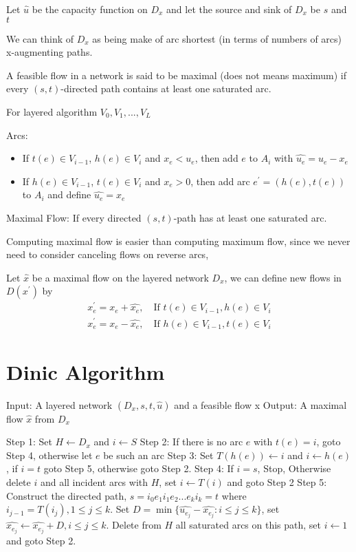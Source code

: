 				Let $\hat{u}$ be the capacity function on $D_x$ and let the source and sink of $D_x$ be $s$ and $t$

				We can think of $D_x$ as being make of arc shortest (in terms of numbers of arcs) x-augmenting paths.

				A feasible flow in a network is said to be maximal (does not means maximum) if every $(s, t)$-directed path contains at least one saturated arc.

				For layered algorithm $V_0, V_1, ..., V_L$

				Arcs:
				\begin{itemize}
					\item If $t(e)\in V_{i-1}$, $h(e) \in V_i$ and $x_e < u_e$, then add $e$ to $A_i$ with $\hat{u_e} = u_e - x_e$
					\item If $h(e) \in V_{i-1}$, $t(e)\in V_i$ and $x_e > 0$, then add arc $e^\prime = (h(e), t(e))$ to $A_i$ and define $\hat{u_e} = x_e$
				\end{itemize}

				Maximal Flow: If every directed $(s, t)$-path has at least one saturated arc.

				Computing maximal flow is easier than computing maximum flow, since we never need to consider canceling flows on reverse arcs,

				Let $\hat{x}$ be a maximal flow on the layered network $D_x$, we can define new flows in $D(x^\prime)$ by
				\begin{align}
					x_e^\prime = x_e + \hat{x_e}, \quad \text{If } t(e) \in V_{i-1}, h(e)\in V_i\\
					x_e^\prime = x_e - \hat{x_e}, \quad \text{If } h(e) \in V_{i-1}, t(e)\in V_i
				\end{align}

			\section{Dinic Algorithm}
				Input: A layered network $(D_x, s, t, \hat{u})$ and a feasible flow x
				Output: A maximal flow $\hat{x}$ from $D_x$

				Step 1: Set $H\gets D_x$ and $i\gets S$
				Step 2: If there is no arc $e$ with $t(e) = i$, goto Step 4, otherwise let $e$ be such an arc
				Step 3: Set $T(h(e))\gets i$ and $i \gets h(e)$, if $i= t$ goto Step 5, otherwise goto Step 2.
				Step 4: If $i = s$, Stop, Otherwise delete $i$ and all incident arcs with $H$, set $i \gets T(i)$ and goto Step 2
				Step 5: Construct the directed path, $s = i_0e_1i_1e_2...e_ki_k=t$ where $i_{j-1} = T(i_j), 1\le j \le k$. Set $D=\min\{\hat{u_{e_j}}-\hat{x_{e_j}}:i\le j \le k\}$, set $\hat{x_{e_j}} \gets \hat{x_{e_j}} + D, i \le j \le k$. Delete from $H$ all saturated arcs on this path, set $i \gets 1$ and goto Step 2.

